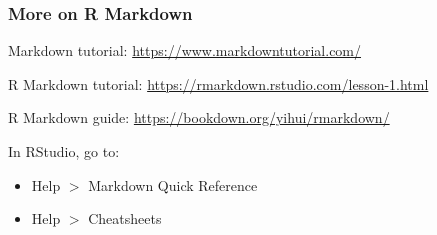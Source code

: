 \documentclass{beamer}
\begin{document}
	\begin{frame}
		\frametitle{More on R Markdown}

		Markdown tutorial: \href{https://www.markdowntutorial.com/}{https://www.markdowntutorial.com/}

		\vspace{1em}
		
		R Markdown tutorial: \href{https://rmarkdown.rstudio.com/lesson-1.html}{https://rmarkdown.rstudio.com/lesson-1.html}

		\vspace{1em}

		R Markdown guide: \href{https://bookdown.org/yihui/rmarkdown/}{https://bookdown.org/yihui/rmarkdown/}

		\vspace{1em}

		In RStudio, go to:
		\begin{itemize}
			\item Help $>$ Markdown Quick Reference
			\item Help $>$ Cheatsheets
		\end{itemize}

	\end{frame}
\end{document}
